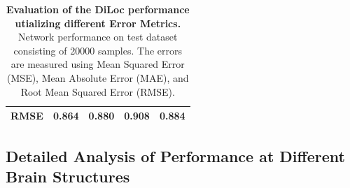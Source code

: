 \documentclass[a4paper, UKenglish, 11pt]{uiomaster}
\begin{document}
\begin{table}[!htb]
\begin{tabular}{l|cccc|}
\multicolumn{1}{|l|}{\cellcolor[HTML]{EFEFEF}RMSE} & \multicolumn{1}{c|}{0.864}                                                                                  & \multicolumn{1}{c|}{0.880}                                                                                   & \multicolumn{1}{c|}{0.908}                                                                                   & 0.884                                                                                                              \\ \hline
\end{tabular}
\caption{\textbf{Evaluation of the DiLoc performance utializing different Error Metrics.} \newline
Network performance on test dataset consisting of 20000 samples. The errors are measured using Mean Squared Error (MSE), Mean Absolute Error (MAE), and Root Mean Squared Error (RMSE).}
\label{table:error_simple_dipole}
\end{table}

\subsection{Detailed Analysis of Performance at Different Brain Structures}
\end{document}
